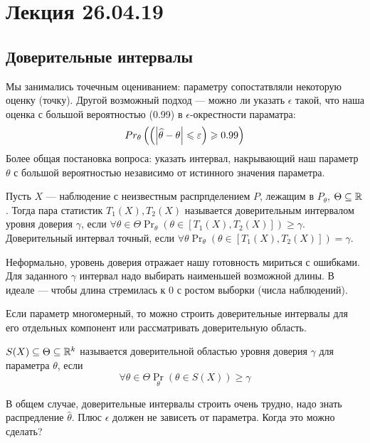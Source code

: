 \section{Лекция 26.04.19}
\subsection{Доверительные интервалы}

Мы занимались точечным оцениванием: параметру сопостатвляли некоторую оценку (точку). Другой возможный подход --- можно ли указать \(\epsilon\) такой, что наша оценка с большой вероятностью (0.99) в \(\epsilon\)-окрестности параматра:
\begin{displaymath}
    Pr_{\theta}\left(\left(\left|\widehat{\theta} - \theta\right| \leqslant \varepsilon\right) \geqslant 0.99\right)
\end{displaymath}
Более общая постановка вопроса: указать интервал, накрывающий наш параметр \(\theta\) с большой вероятностью независимо от истинного значения параметра.
\begin{definition}
    Пусть \(X\) --- наблюдение с неизвестным распрпделением \(P\), лежащим в \(P_\theta\), \(\Theta \subseteq \mathbb{R}\). Тогда пара статистик \(T_1(X), T_2(X)\) называется доверительным интервалом уровня доверия \(\gamma\), если \(\forall \theta \in \Theta \Pr_\theta\left(\theta \in [T_1(X), T_2(X)]\right) \geq \gamma\). Доверительный интервал точный, если \(\forall \theta \Pr_\theta(\theta \in [T_1(X), T_2(X)]) = \gamma\).
\end{definition}
Неформально, уровень доверия отражает нашу готовность мириться с ошибками. Для заданного \(\gamma\) интервал надо выбирать наименьшей возможной длины. В идеале --- чтобы длина стремилась к 0 с ростом выборки (числа наблюдений).

Если параметр многомерный, то можно строить доверительные интервалы для его отдельных компонент или рассматривать доверительную область.
\begin{definition}
    \(S(X) \subseteq \Theta \subseteq \mathbb{R}^k\) называется доверительной областью уровня доверия \(\gamma\) для параметра \(\theta\), если
    \begin{displaymath}
        \forall \theta \in \Theta \Pr_\theta \left(\theta \in S(X)\right) \geq \gamma
    \end{displaymath}
\end{definition}
В общем случае, доверительные интервалы строить очень трудно, надо знать распредление \(\widehat{\theta}\). Плюс \(\epsilon\) должен не зависеть от параметра. Когда это можно сделать?

